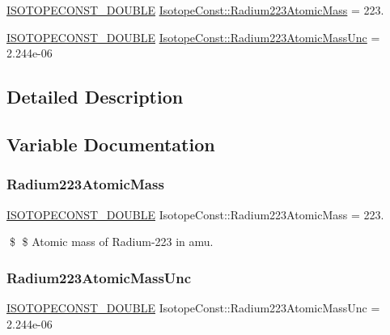 \begin{DoxyCompactItemize}
\item 
\mbox{\hyperlink{group___isotope_const-_macros_ga8f45a7272ce02c0b4c65c44636ed719a}{I\+S\+O\+T\+O\+P\+E\+C\+O\+N\+S\+T\+\_\+\+D\+O\+U\+B\+LE}} \mbox{\hyperlink{group___isotope_const-_radium-_ra223_gad61411d6a0e52d46eb84fc6db3a57481}{Isotope\+Const\+::\+Radium223\+Atomic\+Mass}} = 223.
\item 
\mbox{\hyperlink{group___isotope_const-_macros_ga8f45a7272ce02c0b4c65c44636ed719a}{I\+S\+O\+T\+O\+P\+E\+C\+O\+N\+S\+T\+\_\+\+D\+O\+U\+B\+LE}} \mbox{\hyperlink{group___isotope_const-_radium-_ra223_gad48430325282b17ed3db39ed3207cf90}{Isotope\+Const\+::\+Radium223\+Atomic\+Mass\+Unc}} = 2.\+244e-\/06
\end{DoxyCompactItemize}


\subsection{Detailed Description}


\subsection{Variable Documentation}
\mbox{\label{group___isotope_const-_radium-_ra223_gad61411d6a0e52d46eb84fc6db3a57481}} 
\subsubsection{\texorpdfstring{Radium223\+Atomic\+Mass}{Radium223AtomicMass}}
{\footnotesize\ttfamily \mbox{\hyperlink{group___isotope_const-_macros_ga8f45a7272ce02c0b4c65c44636ed719a}{I\+S\+O\+T\+O\+P\+E\+C\+O\+N\+S\+T\+\_\+\+D\+O\+U\+B\+LE}} Isotope\+Const\+::\+Radium223\+Atomic\+Mass = 223.}

\$ \$ Atomic mass of Radium-\/223 in amu. \mbox{\label{group___isotope_const-_radium-_ra223_gad48430325282b17ed3db39ed3207cf90}} 
\subsubsection{\texorpdfstring{Radium223\+Atomic\+Mass\+Unc}{Radium223AtomicMassUnc}}
{\footnotesize\ttfamily \mbox{\hyperlink{group___isotope_const-_macros_ga8f45a7272ce02c0b4c65c44636ed719a}{I\+S\+O\+T\+O\+P\+E\+C\+O\+N\+S\+T\+\_\+\+D\+O\+U\+B\+LE}} Isotope\+Const\+::\+Radium223\+Atomic\+Mass\+Unc = 2.\+244e-\/06}

